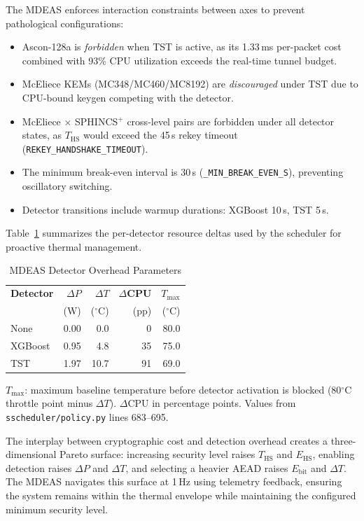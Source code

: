 The MDEAS enforces interaction constraints between axes to prevent
pathological configurations:
\begin{itemize}
\item Ascon-128a is \emph{forbidden} when TST is active, as its
  1.33\,ms per-packet cost combined with 93\% CPU utilization
  exceeds the real-time tunnel budget.
\item McEliece KEMs (MC348/MC460/MC8192) are \emph{discouraged} under
  TST due to CPU-bound keygen competing with the detector.
\item McEliece $\times$ SPHINCS$^+$ cross-level pairs are forbidden under
  all detector states, as $T_\text{HS}$ would exceed the
  45\,s rekey timeout (\texttt{REKEY\_HANDSHAKE\_TIMEOUT}).
\item The minimum break-even interval is 30\,s
  (\texttt{\_MIN\_BREAK\_EVEN\_S}), preventing oscillatory switching.
\item Detector transitions include warmup durations: XGBoost 10\,s,
  TST 5\,s.
\end{itemize}

Table~\ref{tab:detector_overhead} summarizes the per-detector resource
deltas used by the scheduler for proactive thermal management.

\begin{table}[t]
\centering
\caption{MDEAS Detector Overhead Parameters}
\label{tab:detector_overhead}
\footnotesize
\begin{tabular}{@{}lrrrr@{}}
\toprule
\textbf{Detector} &
  \textbf{$\Delta P$} & \textbf{$\Delta T$} &
  \textbf{$\Delta$CPU} & \textbf{$T_\text{max}$} \\
& (W) & ($^\circ$C) & (pp) & ($^\circ$C) \\
\midrule
None    & 0.00 & 0.0  & 0  & 80.0 \\
XGBoost & 0.95 & 4.8  & 35 & 75.0 \\
TST     & 1.97 & 10.7 & 91 & 69.0 \\
\bottomrule
\end{tabular}
\begin{tablenotes}
\footnotesize
\item $T_\text{max}$: maximum baseline temperature before detector
  activation is blocked (80$^\circ$C throttle point minus $\Delta T$).
  $\Delta$CPU in percentage points.
  Values from \texttt{sscheduler/policy.py} lines 683--695.
\end{tablenotes}
\end{table}

The interplay between cryptographic cost and detection overhead
creates a three-dimensional Pareto surface: increasing security level
raises $T_\text{HS}$ and $E_\text{HS}$, enabling detection raises
$\Delta P$ and $\Delta T$, and selecting a heavier AEAD raises
$E_\text{bit}$ and $\Delta T$.  The MDEAS navigates this surface at
1\,Hz using telemetry feedback, ensuring the system remains within
the thermal envelope while maintaining the configured minimum security
level.

